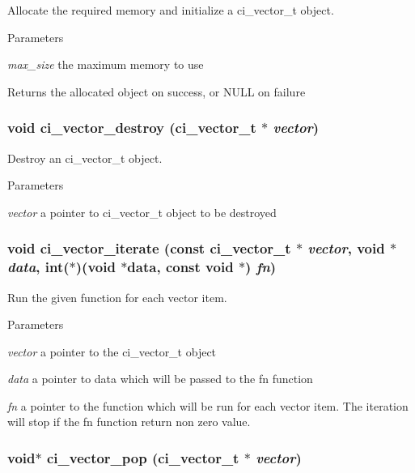 Allocate the required memory and initialize a ci\_\-vector\_\-t object. 
\begin{DoxyParams}{Parameters}
\item[{\em max\_\-size}]the maximum memory to use \end{DoxyParams}
\begin{DoxyReturn}{Returns}
the allocated object on success, or NULL on failure 
\end{DoxyReturn}
\hypertarget{group__VECTORS_gaaa97fdab2cf5e2503ccd490d438be3a6}{
\subsubsection[{ci\_\-vector\_\-destroy}]{\setlength{\rightskip}{0pt plus 5cm}void ci\_\-vector\_\-destroy ({\bf ci\_\-vector\_\-t} $\ast$ {\em vector})}}
\label{group__VECTORS_gaaa97fdab2cf5e2503ccd490d438be3a6}


Destroy an ci\_\-vector\_\-t object. 
\begin{DoxyParams}{Parameters}
\item[{\em vector}]a pointer to ci\_\-vector\_\-t object to be destroyed \end{DoxyParams}
\hypertarget{group__VECTORS_gada645b52cd6479da84f52a53982b412d}{
\subsubsection[{ci\_\-vector\_\-iterate}]{\setlength{\rightskip}{0pt plus 5cm}void ci\_\-vector\_\-iterate (const {\bf ci\_\-vector\_\-t} $\ast$ {\em vector}, \/  void $\ast$ {\em data}, \/  int($\ast$)(void $\ast$data, const void $\ast$) {\em fn})}}
\label{group__VECTORS_gada645b52cd6479da84f52a53982b412d}


Run the given function for each vector item. 
\begin{DoxyParams}{Parameters}
\item[{\em vector}]a pointer to the ci\_\-vector\_\-t object \item[{\em data}]a pointer to data which will be passed to the fn function \item[{\em fn}]a pointer to the function which will be run for each vector item. The iteration will stop if the fn function return non zero value. \end{DoxyParams}
\hypertarget{group__VECTORS_ga5c4c82776faa4553313427e18b504cb7}{
\subsubsection[{ci\_\-vector\_\-pop}]{\setlength{\rightskip}{0pt plus 5cm}void$\ast$ ci\_\-vector\_\-pop ({\bf ci\_\-vector\_\-t} $\ast$ {\em vector})}}
\label{group__VECTORS_ga5c4c82776faa4553313427e18b504cb7}


